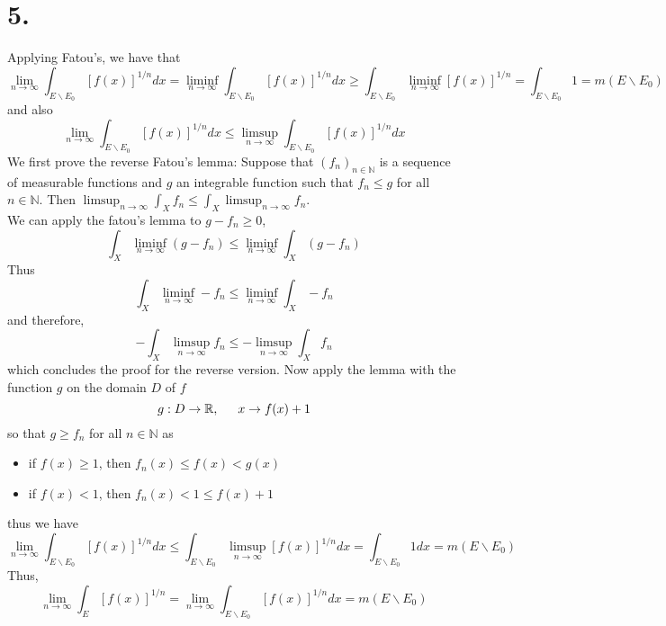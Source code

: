 \documentclass[11pt]{article}
\theoremstyle{mystyle}
\theoremstyle{definition}
\begin{document}
\section*{5.}
Applying Fatou's, we have that  
\[
  \lim_{n \to \infty} \int_{E\backslash E_0} [f(x)]^{1/n} dx = \liminf_{n \to \infty} \int_{E\backslash E_0} [f(x)]^{1/n} dx \ge \int_{E \backslash E_0} \liminf_{n \to \infty} [f(x)]^{1/n} = \int_{E\backslash E_0} 1 = m(E \backslash E_0)
\]
and also 
\[
  \lim_{n \to \infty} \int_{E\backslash E_0} [f(x)]^{1/n} dx \le \limsup_{n \to \infty} \int_{E\backslash E_0} [f(x)]^{1/n} dx 
\]
We first prove the reverse Fatou's lemma: Suppose that $(f_n)_{n\in \mathbb{N}}$ is a sequence of measurable functions and $g$ an integrable function such that $f_n \le g$ for all $n \in \mathbb{N}$. Then $\limsup_{n \to \infty} \int_{X} f_n \le \int_{X} \limsup_{n \to \infty} f_n$. \\
We can apply the fatou's lemma to $g-f_n \ge 0$, 
\[
  \int_X \liminf_{n \to \infty} (g-f_n) \le \liminf_{n \to \infty} \int_X (g-f_n)
\]
Thus 
\[
  \int_X \liminf_{n \to \infty} - f_n \le \liminf_{n \to \infty} \int_X -f_n
\]
and therefore, 
\[
  - \int_X \limsup_{n \to \infty} f_n \le -\limsup_{n \to \infty} \int_X f_n
\]
which concludes the proof for the reverse version. Now apply the lemma with the function $g$ on the domain $D$ of $f$ 
\[
  g: D \to \mathbb{R}, \indent x \to f(x) + 1
\]
so that $g \ge f_n$ for all $n \in \mathbb{N}$ as 
\begin{itemize}
  \item if $f(x) \ge 1$, then $f_n(x) \le f(x) < g(x)$  
  \item if $f(x) < 1$, then $f_n(x) < 1 \le f(x) + 1$ 
\end{itemize}
thus we have 
\[
  \lim_{n \to \infty} \int_{E \backslash E_0} [f(x)]^{1/n} dx \le \int_{E \backslash E_0} \limsup_{n \to \infty} [f(x)]^{1/n} dx = \int_{E \backslash E_0} 1 dx = m(E \backslash E_0) 
\]
Thus, 
\[
  \lim_{n \to \infty} \int_E [f(x)]^{1/n} = \lim_{n \to \infty} \int_{E \backslash E_0} [f(x)]^{1/n} dx = m(E \backslash E_0)
\]
\end{document}

